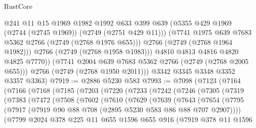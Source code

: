 \begin{lexlean}{RustCore}
\begin{coremodule}
                @241
                @11
                @15
                @1969
                @1982
                @1992
                @633
                @399
                @639
                (@5355 @429 @1969 (@2744 (@2745 @1969)) (@2749 (@2751 @429 @11)))
                (@7741 @1975 @639 @7683 @5362 @2766 (@2749 (@2768 @1976 @655)))
                @2766
                (@2749 (@2768 @1964 @1982)))
              @2766
              (@2749 (@2768 @1958 @1983)))
            @4810
            @4813
            @4816
            @4820
            @4825
            @7770))
        (@7741 @2004 @639 @7683 @5362 @2766 (@2749 (@2768 @2005 @655)))
        @2766
        (@2749 (@2768 @1950 @2011)))
      @3342
      @3345
      @3348
      @3352
      @3357
      @3363)
@7919 := @2886 @5230 @583
@7993 := @7098
    (@7123
      (@7164
        (@7166
          (@7168
            (@7185
              (@7203
                (@7220
                  (@7233
                    (@7242
                      (@7246
                        (@7305
                          (@7319
                            (@7383
                              (@7472
                                (@7508
                                  (@7602
                                    (@7610
                                      (@7629
                                        (@7639
                                          (@7643
                                            (@7654
                                              (@7795
                                                (@7917
                                                  (@7919
                                                    @90
                                                    @88
                                                    @708
                                                    (@2895 @5230 @583 @86 @88 @707 @2907))))
                                              (@7799
                                                @2024
                                                @378
                                                @225
                                                @11
                                                @655
                                                @1596
                                                @655
                                                @916
                                                (@7919
                                                  @378
                                                  @11
                                                  @1596

\end{coremodule}
\end{lexlean}
